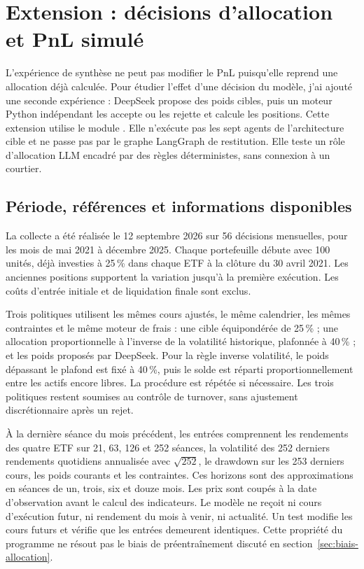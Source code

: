 \section{Extension : décisions d'allocation et PnL simulé}\label{sec:protocole-allocation}

L'expérience de synthèse ne peut pas modifier le PnL puisqu'elle reprend une allocation déjà calculée. Pour étudier l'effet d'une décision du modèle, j'ai ajouté une seconde expérience : DeepSeek propose des poids cibles, puis un moteur Python indépendant les accepte ou les rejette et calcule les positions. Cette extension utilise le module . Elle n'exécute pas les sept agents de l'architecture cible et ne passe pas par le graphe LangGraph de restitution. Elle teste un rôle d'allocation LLM encadré par des règles déterministes, sans connexion à un courtier.

\subsection{Période, références et informations disponibles}

La collecte a été réalisée le 12 septembre 2026 sur 56 décisions mensuelles, pour les mois de mai 2021 à décembre 2025. Chaque portefeuille débute avec 100 unités, déjà investies à 25\,\% dans chaque ETF à la clôture du 30 avril 2021. Les anciennes positions supportent la variation jusqu'à la première exécution. Les coûts d'entrée initiale et de liquidation finale sont exclus.

Trois politiques utilisent les mêmes cours ajustés, le même calendrier, les mêmes contraintes et le même moteur de frais : une cible équipondérée de 25\,\% ; une allocation proportionnelle à l'inverse de la volatilité historique, plafonnée à 40\,\% ; et les poids proposés par DeepSeek. Pour la règle inverse volatilité, le poids dépassant le plafond est fixé à 40\,\%, puis le solde est réparti proportionnellement entre les actifs encore libres. La procédure est répétée si nécessaire. Les trois politiques restent soumises au contrôle de turnover, sans ajustement discrétionnaire après un rejet.

À la dernière séance du mois précédent, les entrées comprennent les rendements des quatre ETF sur 21, 63, 126 et 252 séances, la volatilité des 252 derniers rendements quotidiens annualisée avec $\sqrt{252}$, le drawdown sur les 253 derniers cours, les poids courants et les contraintes. Ces horizons sont des approximations en séances de un, trois, six et douze mois. Les prix sont coupés à la date d'observation avant le calcul des indicateurs. Le modèle ne reçoit ni cours d'exécution futur, ni rendement du mois à venir, ni actualité. Un test modifie les cours futurs et vérifie que les entrées demeurent identiques. Cette propriété du programme ne résout pas le biais de préentraînement discuté en section~\ref{sec:biais-allocation}.

